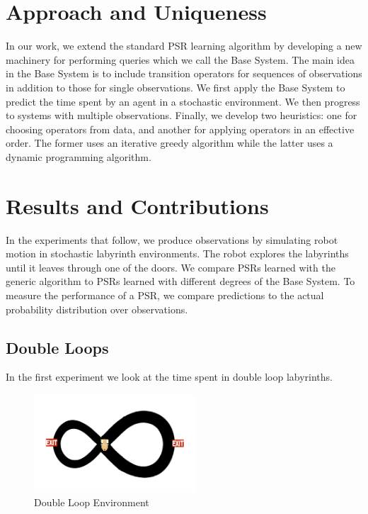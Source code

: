 \documentclass{acm_proc_article-sp}
\begin{document}
\section{Approach and Uniqueness} 

In our work, we extend the standard PSR learning algorithm by developing a new machinery for performing queries which we call the Base System. The main idea in the Base System is to include transition operators for sequences of observations in addition to those for single observations. We first apply the Base System to predict the time spent by an agent in a stochastic environment. We then progress to systems with multiple observations. Finally, we develop two heuristics: one for choosing operators from data, and another for applying operators in an effective order. The former uses an iterative greedy algorithm while the latter uses a dynamic programming algorithm.

\section{Results and Contributions}

In the experiments that follow, we produce observations by simulating robot motion in stochastic labyrinth environments. The robot explores the labyrinths until it leaves through one of the doors. We compare PSRs learned with the generic algorithm to PSRs learned with different degrees of the Base System. To measure the performance of a PSR, we compare predictions to the actual probability distribution over observations.

\subsection{Double Loops}

In the first experiment we look at the time spent in double loop labyrinths. 


\begin{figure}[ht!]
\centering
\includegraphics[width=60mm]{lucasplots/monImages/doubleLoopImage.png}
\caption{Double Loop Environment\label{overflow}}
\end{figure}
\end{document}
